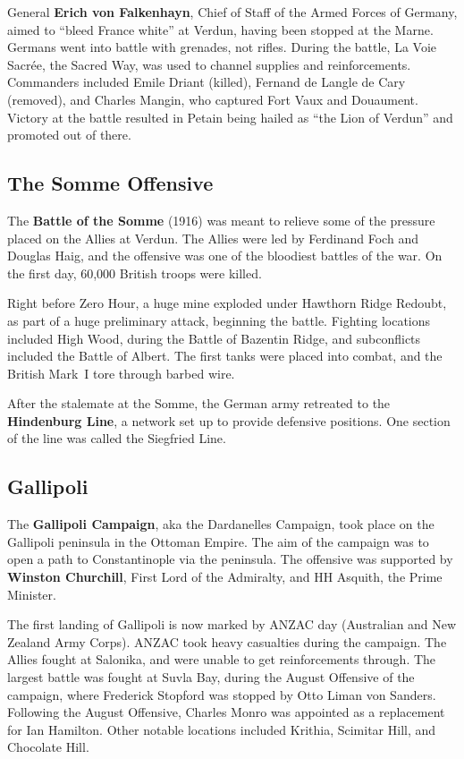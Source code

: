 General \textbf{Erich von Falkenhayn}, Chief of Staff of the Armed Forces of Germany,
aimed to ``bleed France white'' at Verdun, having been stopped at the Marne.
Germans went into battle with grenades, not rifles.
During the battle, La Voie Sacr\'ee, the Sacred Way, was used to channel supplies and reinforcements.
Commanders included Emile Driant (killed), Fernand de Langle de Cary (removed),
and Charles Mangin, who captured Fort Vaux and Douaument.
Victory at the battle resulted in Petain being hailed as ``the Lion of Verdun'' and promoted out of there.

\subsection*{The Somme Offensive}

The \textbf{Battle of the Somme} (1916) was meant to relieve some of the pressure placed on the Allies at Verdun.
The Allies were led by Ferdinand Foch and Douglas Haig,
and the offensive was one of the bloodiest battles of the war.
On the first day, 60,000 British troops were killed.

Right before Zero Hour, a huge mine exploded under Hawthorn Ridge Redoubt,
as part of a huge preliminary attack, beginning the battle.
Fighting locations included High Wood, during the Battle of Bazentin Ridge,
and subconflicts included the Battle of Albert.
The first tanks were placed into combat, and the British Mark~I tore through barbed wire.

After the stalemate at the Somme, the German army retreated to the \textbf{Hindenburg Line},
a network set up to provide defensive positions.
One section of the line was called the Siegfried Line.

\subsection*{Gallipoli}

The \textbf{Gallipoli Campaign}, aka the Dardanelles Campaign,
took place on the Gallipoli peninsula in the Ottoman Empire.
The aim of the campaign was to open a path to Constantinople via the peninsula.
The offensive was supported by \textbf{Winston Churchill}, First Lord of the Admiralty,
and HH Asquith, the Prime Minister.

The first landing of Gallipoli is now marked by ANZAC day (Australian and New Zealand Army Corps).
ANZAC took heavy casualties during the campaign.
The Allies fought at Salonika, and were unable to get reinforcements through.
The largest battle was fought at Suvla Bay, during the August Offensive of the campaign,
where Frederick Stopford was stopped by Otto Liman von Sanders.
Following the August Offensive, Charles Monro was appointed as a replacement for Ian Hamilton.
Other notable locations included Krithia, Scimitar Hill, and Chocolate Hill.

